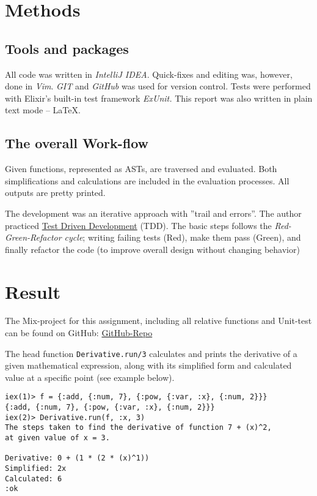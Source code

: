 \documentclass[a4paper,11pt]{article}
\begin{document}
\section*{Methods}
\label{sec:methods}

\subsection*{Tools and packages}
\label{subsec:tools}
All code was written in \emph{IntelliJ IDEA}.
Quick-fixes and editing was, however, done in \emph{Vim}. 
\emph{GIT} and \emph{GitHub} was used for version control.
Tests were performed with Elixir's built-in test framework \emph{ExUnit.}
This report was also written in plain text mode -- \LaTeX.

\subsection*{The overall Work-flow} %
\label{subsec:workflow}
Given functions, represented as ASTs, are traversed and evaluated.
Both simplifications and calculations are included in the evaluation processes.
All outputs are pretty printed.

The development was an iterative approach with ''trail and errors''.
The author practiced
\href{https://www.elixirwiki.com/wiki/Test-Driven_Development_in_Elixir}{Test Driven Development}
(TDD).
The basic steps follows the \emph{Red-Green-Refactor cycle}; writing failing tests (Red), make them pass (Green),
and finally refactor the code (to improve overall design without changing behavior)

\section*{Result}
\label{sec:result}
The Mix-project for this assignment, including all relative functions and Unit-test can be found on GitHub:
\href{https://github.com/VincentFerrigan/kth-id1019-programming-ii/tree/main/tasks/1/derivative}{GitHub-Repo}

The head function
\texttt{Derivative.run/3}
calculates and prints the derivative of a given mathematical expression,
along with its simplified form and calculated value at a specific point (see example
below).
\begin{verbatim}
iex(1)> f = {:add, {:num, 7}, {:pow, {:var, :x}, {:num, 2}}}
{:add, {:num, 7}, {:pow, {:var, :x}, {:num, 2}}}
iex(2)> Derivative.run(f, :x, 3)
The steps taken to find the derivative of function 7 + (x)^2,
at given value of x = 3.

Derivative: 0 + (1 * (2 * (x)^1))
Simplified: 2x
Calculated: 6
:ok
\end{verbatim}
\end{document}
